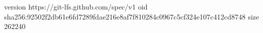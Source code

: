 version https://git-lfs.github.com/spec/v1
oid sha256:92502f2db61e6fd7289fdae216e8af7f810284c0967c5cf324e107c412cd8748
size 262240
